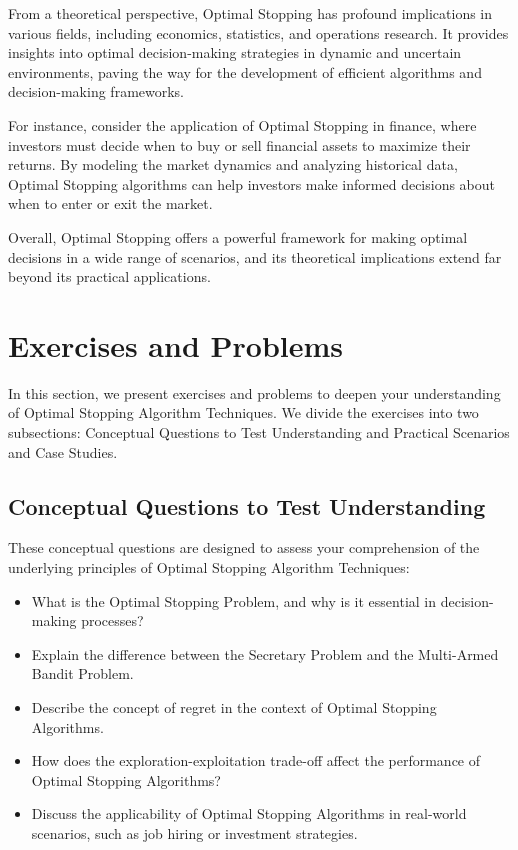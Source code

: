 \documentclass[12pt]{book} %
\begin{document}
From a theoretical perspective, Optimal Stopping has profound implications in various fields, including economics, statistics, and operations research. It provides insights into optimal decision-making strategies in dynamic and uncertain environments, paving the way for the development of efficient algorithms and decision-making frameworks.

For instance, consider the application of Optimal Stopping in finance, where investors must decide when to buy or sell financial assets to maximize their returns. By modeling the market dynamics and analyzing historical data, Optimal Stopping algorithms can help investors make informed decisions about when to enter or exit the market.

Overall, Optimal Stopping offers a powerful framework for making optimal decisions in a wide range of scenarios, and its theoretical implications extend far beyond its practical applications.


\section{Exercises and Problems}
In this section, we present exercises and problems to deepen your understanding of Optimal Stopping Algorithm Techniques. We divide the exercises into two subsections: Conceptual Questions to Test Understanding and Practical Scenarios and Case Studies.

\subsection{Conceptual Questions to Test Understanding}
These conceptual questions are designed to assess your comprehension of the underlying principles of Optimal Stopping Algorithm Techniques:

\begin{itemize}
    \item What is the Optimal Stopping Problem, and why is it essential in decision-making processes?
    \item Explain the difference between the Secretary Problem and the Multi-Armed Bandit Problem.
    \item Describe the concept of regret in the context of Optimal Stopping Algorithms.
    \item How does the exploration-exploitation trade-off affect the performance of Optimal Stopping Algorithms?
    \item Discuss the applicability of Optimal Stopping Algorithms in real-world scenarios, such as job hiring or investment strategies.
\end{itemize}
\end{document}
